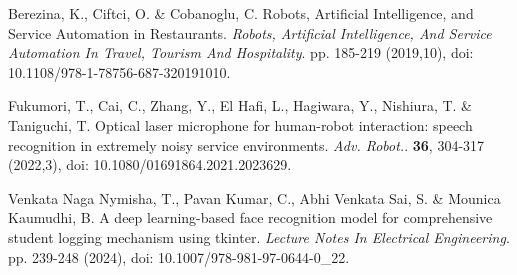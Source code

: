 \documentclass{../styles/svproc}
\begin{document}
\begin{thebibliography}{9}
	Berezina, K., Ciftci, O. \& Cobanoglu, C. Robots, Artificial Intelligence, and Service Automation in Restaurants. {\em Robots, Artificial Intelligence, And Service Automation In Travel, Tourism And Hospitality}. pp. 185-219 (2019,10), doi: 10.1108/978-1-78756-687-320191010.
	
	Fukumori, T., Cai, C., Zhang, Y., El Hafi, L., Hagiwara, Y., Nishiura, T. \& Taniguchi, T. Optical laser microphone for human-robot interaction: speech recognition in extremely noisy service environments. {\em Adv. Robot.}. \textbf{36}, 304-317 (2022,3), doi: 10.1080/01691864.2021.2023629.
	
	Venkata Naga Nymisha, T., Pavan Kumar, C., Abhi Venkata Sai, S. \& Mounica Kaumudhi, B. A deep learning-based face recognition model for comprehensive student logging mechanism using tkinter. {\em Lecture Notes In Electrical Engineering}. pp. 239-248 (2024), doi: 10.1007/978-981-97-0644-0\_22.
	
\end{thebibliography}
\end{document}
